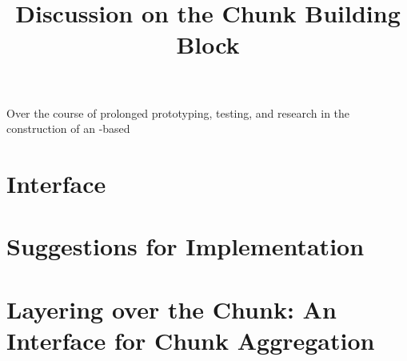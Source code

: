 \documentclass[10pt, a4paper]{article}
\begin{document}
\title{Discussion on the Chunk Building Block}
  
\maketitle


Over the course of prolonged prototyping, testing, and research in the construction of an \R{}-based 

\section{Interface}
\section{Suggestions for Implementation}
\section{Layering over the Chunk: An Interface for Chunk Aggregation}

\end{document}
